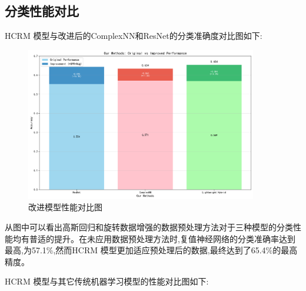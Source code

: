 \documentclass{article}
\begin{document}
\begin{CJK}{UTF8}{gbsn}
\subsection{分类性能对比}
HCRM 模型与改进后的ComplexNN和ResNet的分类准确度对比图如下:

\begin{figure}[H]
    \centering
    \includegraphics[width=0.9\textwidth]{figure/image14.png}
    \caption{改进模型性能对比图}
    \label{fig:improved_model_comparison}
\end{figure}

从图中可以看出高斯回归和旋转数据增强的数据预处理方法对于三种模型的分类性能均有普适的提升。在未应用数据预处理方法时,复值神经网络的分类准确率达到最高,为57.1\%,然而HCRM 模型更加适应预处理后的数据,最终达到了65.4\%的最高精度。

HCRM 模型与其它传统机器学习模型的性能对比图如下:


\end{CJK}
\end{document}
